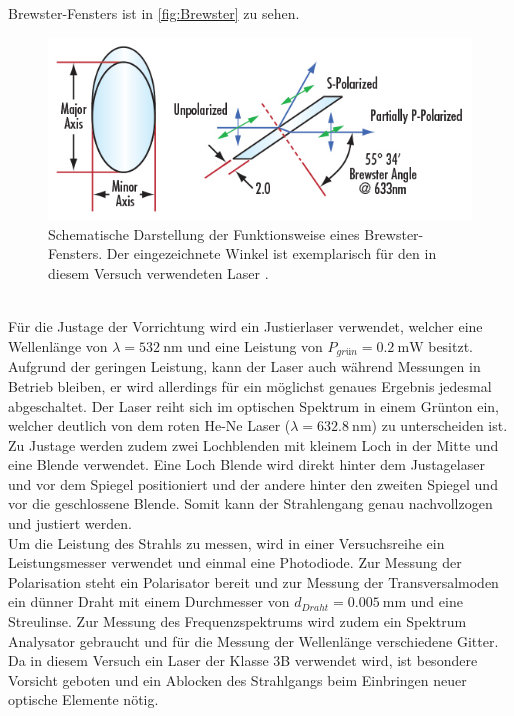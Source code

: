 Brewster-Fensters ist in \autoref{fig:Brewster} zu sehen.
\begin{figure}
    \centering
    \includegraphics[width = \textwidth]{v61_bilder/Brewster.jpg}
    \caption{Schematische Darstellung der Funktionsweise eines Brewster-Fensters. Der eingezeichnete Winkel ist exemplarisch für den in diesem Versuch verwendeten Laser \cite{Brewster}.}
    \label{fig:Brewster}
\end{figure}
\\Für die Justage der Vorrichtung wird ein Justierlaser verwendet, welcher eine Wellenlänge von $\lambda = \qty{532}{\nano\metre}$ und eine Leistung von $P_{grün}= \qty{0.2}{\milli\watt}$ besitzt. Aufgrund der geringen
Leistung, kann der Laser auch während Messungen in Betrieb bleiben, er wird allerdings für ein möglichst genaues Ergebnis jedesmal abgeschaltet. Der Laser reiht sich im optischen Spektrum in einem Grünton ein,
welcher deutlich von dem roten He-Ne Laser ($\lambda = \qty{632.8}{\nano\metre}$) zu unterscheiden ist. Zu Justage werden zudem zwei Lochblenden mit kleinem Loch in der Mitte und eine Blende verwendet. Eine Loch Blende wird direkt
hinter dem Justagelaser und vor dem Spiegel positioniert und der andere hinter den zweiten Spiegel und vor die geschlossene Blende. Somit kann der Strahlengang genau nachvollzogen und justiert werden.\\
Um die Leistung des Strahls zu messen, wird in einer Versuchsreihe ein Leistungsmesser verwendet und einmal eine Photodiode. Zur Messung der Polarisation steht ein Polarisator bereit und zur Messung der Transversalmoden ein dünner Draht mit 
einem Durchmesser von $d_{Draht} = \qty{0.005}{\milli\metre}$ und eine Streulinse. Zur Messung des Frequenzspektrums wird zudem ein Spektrum Analysator gebraucht und für die Messung der Wellenlänge verschiedene Gitter.\\
Da in diesem Versuch ein Laser der Klasse 3B verwendet wird, ist besondere Vorsicht geboten und ein Ablocken des Strahlgangs beim Einbringen neuer optische Elemente nötig.

